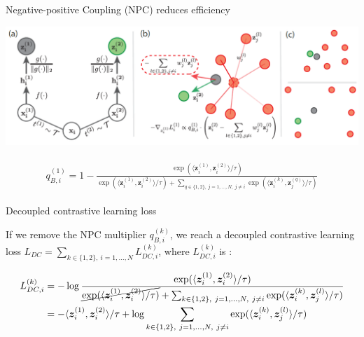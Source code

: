 \documentclass[aspectratio=169,mathserif]{beamer}  %
\begin{document}
\begin{frame}{Negative-positive Coupling (NPC) reduces efficiency}

\begin{center}
    \includegraphics[width=\linewidth]{figure12.png}
\end{center}

\pause

\begin{eqnarray*}
\begin{aligned}
q_{B,i}^{(1)}=1-\frac{\exp (\langle \bm{z}_i^{(1)}, \bm{z}_i^{(2)} \rangle / \tau)}{\exp (\langle \bm{z}_i^{(1)}, \bm{z}_i^{(2)} \rangle / \tau) +\sum_{q\in \{1,2\},\ j=1,\ldots,N,\ j\neq i} \exp (\langle \bm{z}_i^{(k)}, \bm{z}_j^{(q)} \rangle / \tau)}
\end{aligned}
\end{eqnarray*}

\end{frame}




\begin{frame}{Decoupled contrastive learning loss}

If we remove the NPC multiplier $q_{B,i}^{(k)}$, we reach a decoupled contrastive learning loss $L_{DC}=\sum_{k\in\{1,2\},\ i=1,\ldots,N}L_{DC,i}^{(k)}$, where $L_{DC,i}^{(k)}$ is :

\begin{eqnarray}
\begin{aligned}
L_{DC,i}^{(k)}
&=-\log \frac{\exp (\langle \bm{z}_i^{(1)}, \bm{z}_i^{(2)} \rangle / \tau)}{\cancel{\exp (\langle \bm{z}_i^{(1)}, \bm{z}_i^{(2)} \rangle / \tau)} +\sum_{k\in \{1,2\},\ j=1,\ldots,N,\ j\neq i} \exp (\langle \bm{z}_i^{(k)}, \bm{z}_j^{(l)} \rangle / \tau)}\\
&=-\langle \bm{z}_i^{(1)},\bm{z}_i^{(2)}\rangle/\tau + \log\sum_{k\in \{1,2\},\ j=1,\ldots,N,\ j\neq i} \exp (\langle \bm{z}_i^{(k)}, \bm{z}_j^{(l)} \rangle / \tau)
\end{aligned}
\end{eqnarray}

\end{frame}
\end{document}
